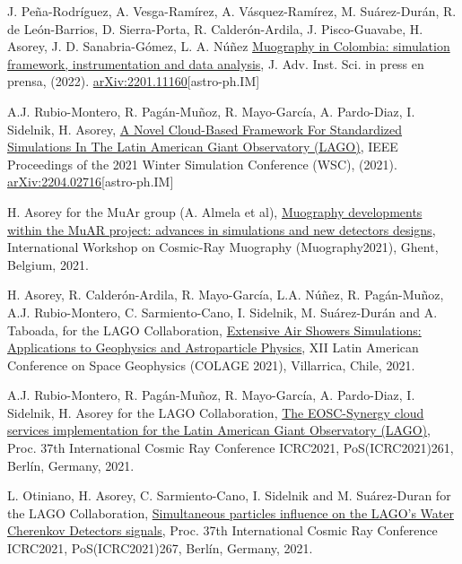 \begin{etaremune}
\item {} J. Peña-Rodríguez, A. Vesga-Ramírez, A. Vásquez-Ramírez, M. Suárez-Durán, R. de León-Barrios, D. Sierra-Porta, R. Calderón-Ardila, J. Pisco-Guavabe, H. Asorey, J. D. Sanabria-Gómez, L. A. Núñez \href{}{Muography in Colombia: simulation framework, instrumentation and data analysis}, J. Adv. Inst. Sci. \ifeng in press \else en prensa\fi, (2022). \href{ http://arxiv.org/abs/2201.11160}{arXiv:2201.11160}[astro-ph.IM]

\item {} A.J. Rubio-Montero, R. Pagán-Muñoz, R. Mayo-García, A. Pardo-Diaz, I. Sidelnik, H. Asorey, \href{https://doi.org/10.1109/WSC52266.2021.9715360}{A Novel Cloud-Based Framework For Standardized Simulations In The Latin American Giant Observatory (LAGO)}, \en IEEE Proceedings of the 2021 Winter Simulation Conference (WSC), (2021). \href{http://arxiv.org/abs/2204.02716}{arXiv:2204.02716}[astro-ph.IM]

\item {} H. Asorey for the MuAr group (A. Almela et al), \href{https://indico.cern.ch/event/1033631/contributions/4530674/}{Muography developments within the MuAR project: advances in simulations and new detectors designs}, \en International Workshop on Cosmic-Ray Muography (Muography2021), Ghent, Belgium, 2021.

\item {} H. Asorey, R. Calderón-Ardila, R. Mayo-García, L.A. Núñez, R. Pagán-Muñoz, A.J. Rubio-Montero, C. Sarmiento-Cano, I. Sidelnik, M. Suárez-Durán and A. Taboada, for the LAGO Collaboration, \href{https://ccc.ciencias.uchile.cl/2021colage/abstracts/Hern%C3%A1n%20Asorey.pdf}{Extensive Air Showers Simulations: Applications to Geophysics and Astroparticle Physics}, \en XII Latin American Conference on Space Geophysics (COLAGE 2021), Villarrica, Chile, 2021.

\item {} A.J. Rubio-Montero, R. Pagán-Muñoz, R. Mayo-García, A. Pardo-Diaz, I. Sidelnik, H. Asorey for the LAGO Collaboration, \href{https://doi.org/10.22323/1.395.0261}{The EOSC-Synergy cloud services implementation for the Latin American Giant Observatory (LAGO)}, \en Proc. 37th International Cosmic Ray Conference ICRC2021, PoS(ICRC2021)261, Berlín, Germany, 2021.

\item {} L. Otiniano, H. Asorey, C. Sarmiento-Cano, I. Sidelnik and M. Suárez-Duran for the LAGO Collaboration, \href{https://doi.org/10.22323/1.395.0267}{Simultaneous particles influence on the LAGO’s Water Cherenkov Detectors signals}, \en Proc. 37th International Cosmic Ray Conference ICRC2021, PoS(ICRC2021)267, Berlín, Germany, 2021.


\end{etaremune}
